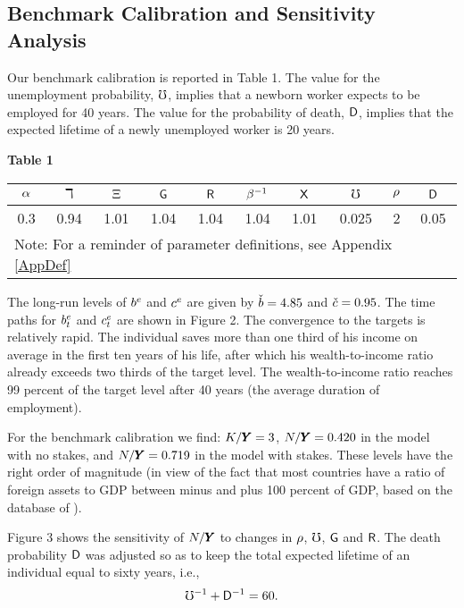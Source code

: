 \documentclass[titlepage,abstract,letterpaper]{econtex}
\renewcommand{\GDPLev}{\ensuremath{\pmb{Y}}}
\begin{document}
\subsection{Benchmark Calibration and Sensitivity Analysis}

Our benchmark calibration is reported in Table 1. The value for the unemployment probability, $\mho$, implies that a newborn worker expects to be employed for 40 years. The value for the probability of death, $\mathsf{D}$, implies that the expected lifetime of a newly unemployed worker is 20 years.

\medskip

\centerline{\bf Table 1}

\begin{center}
\begin{tabular}{|c|c|c|c|c|c|c|c|c|c|}
  \hline
  $\alpha$ & $\daleth$ & $\Xi$ & $\mathsf{G}$ & $\mathsf{R}$ & $\beta^{-1}$ & $\mathsf{X}$ & $\mho$ & $\rho$ & $\mathsf{D}$ \\ \hline
  0.3 & 0.94 & 1.01 & 1.04 & 1.04 & 1.04 & 1.01 & 0.025 & 2 & 0.05 \\
  \hline
\multicolumn{10}{l}{\small Note: For a reminder of parameter definitions, see Appendix \ref{AppDef}} \\
\end{tabular}
\end{center}

The long-run levels of $b^{e}$ and $c^{e}$ are given by
$\check{b}=4.85$ and $\check{c}=0.95$. The time paths for $b^{e}_{t}$ and $c^{e}_{t}$
are shown in Figure 2. The convergence to the targets is relatively
rapid. The individual saves more than one third of his income on
average in the first ten years of his life, after which his
wealth-to-income ratio already exceeds two thirds of the target
level. The wealth-to-income ratio reaches 99 percent of the target
level after 40 years (the average duration of employment).

For the benchmark calibration we find: $\KLev/\GDPLev=3$, $\NFALev/\GDPLev=0.420$ in the model with no stakes, and $\NFALev/\GDPLev=0.719$ in the model with stakes. These levels have the right order of magnitude (in view of the fact that most countries have a ratio of foreign assets to GDP between minus and plus 100 percent of GDP, based on the database of \cite{lmf:mark2}).

Figure 3 shows the sensitivity of $\NFALev/\GDPLev$ to changes in $\rho$, $\mho$, $\mathsf{G}$ and $\mathsf{R}$. The death probability $\mathsf{D}$ was adjusted so as to keep the total expected lifetime of an individual equal to sixty years, i.e.,
\begin{eqnarray*}
\mho^{-1}+\mathsf{D}^{-1}=60.
\end{eqnarray*}
\end{document}
